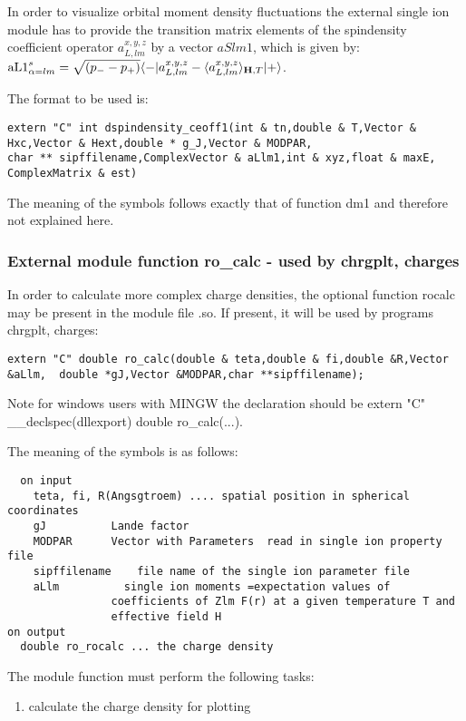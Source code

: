 In order to visualize orbital moment density  fluctuations 
 the external single ion module has to provide the transition
matrix elements of the spindensity coefficient operator $a^{x,y,z}_{L,lm}$ by a
vector $aSlm1$, which is given by:
 ${\rm aL1}^s_{\alpha=lm}=\sqrt{(p_--p_+)}\langle -|a^{x,y,z}_{L,lm}-\langle a^{x,y,z}_{L,lm}\rangle_{\mathbf H,T}|+\rangle$. 

The format to be used is:
{\footnotesize
\begin{verbatim}
extern "C" int dspindensity_ceoff1(int & tn,double & T,Vector & Hxc,Vector & Hext,double * g_J,Vector & MODPAR,
char ** sipffilename,ComplexVector & aLlm1,int & xyz,float & maxE, ComplexMatrix & est)
\end{verbatim}
}
The meaning of the symbols follows exactly that of function 
{\prg dm1} and therefore not explained here.


\subsubsection{External module function {\prg ro\_calc} -
used by {\prg chrgplt},
{\prg charges}
}

In order to calculate more complex charge densities, the optional function
{\prg rocalc} may be present in the module file {\prg *.so}. If present,
it will be used by programs {\prg chrgplt},
{\prg charges}:

\begin{verbatim}
extern "C" double ro_calc(double & teta,double & fi,double &R,Vector &aLlm,  double *gJ,Vector &MODPAR,char **sipffilename);
\end{verbatim}

Note for windows users with MINGW the declaration should be {\prg extern "C" \_\_declspec(dllexport) double %
ro\_calc(...)}.

The meaning of the symbols is as follows:
{\footnotesize
\begin{verbatim}
  on input
    teta, fi, R(Angsgtroem) .... spatial position in spherical coordinates
    gJ          Lande factor
    MODPAR      Vector with Parameters  read in single ion property file
    sipffilename    file name of the single ion parameter file
    aLlm          single ion moments =expectation values of
                coefficients of Zlm F(r) at a given temperature T and
                effective field H
on output
  double ro_rocalc ... the charge density
\end{verbatim}
}

The module function must perform the following tasks:
\begin{enumerate}
\item calculate the charge density for plotting
\end{enumerate}


